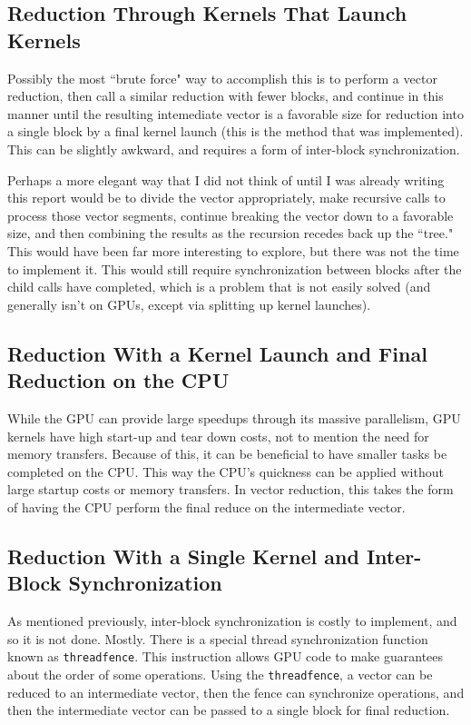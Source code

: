 \documentclass{article}
\begin{document}
\subsection{Reduction Through Kernels That Launch Kernels}
Possibly the most ``brute force" way to accomplish this is to perform a vector reduction, then call a similar reduction with fewer blocks, and continue in this manner until the resulting intemediate vector is a favorable size for reduction into a single block by a final kernel launch (this is the method that was implemented). This can be slightly awkward, and requires a form of inter-block synchronization.

Perhaps a more elegant way that I did not think of until I was already writing this report would be to divide the vector appropriately, make recursive calls to process those vector segments, continue breaking the vector down to a favorable size, and then combining the results as the recursion recedes back up the ``tree." This would have been far more interesting to explore, but there was not the time to implement it. This would still require synchronization between blocks after the child calls have completed, which is a problem that is not easily solved (and generally isn't on GPUs, except via splitting up kernel launches).

\subsection{Reduction With a Kernel Launch and Final Reduction on the CPU}
While the GPU can provide large speedups through its massive parallelism, GPU kernels have high start-up and tear down costs, not to mention the need for memory transfers. Because of this, it can be beneficial to have smaller tasks be completed on the CPU. This way the CPU's quickness can be applied without large startup costs or memory transfers. In vector reduction, this takes the form of having the CPU perform the final reduce on the intermediate vector.

\subsection{Reduction With a Single Kernel and Inter-Block Synchronization}
As mentioned previously, inter-block synchronization is costly to implement, and so it is not done. Mostly. There is a special thread synchronization function known as \texttt{threadfence}. This instruction allows GPU code to make guarantees about the order of some operations. Using the \texttt{threadfence}, a vector can be reduced to an intermediate vector, then the fence can synchronize operations, and then the intermediate vector can be passed to a single block for final reduction.
\end{document}
